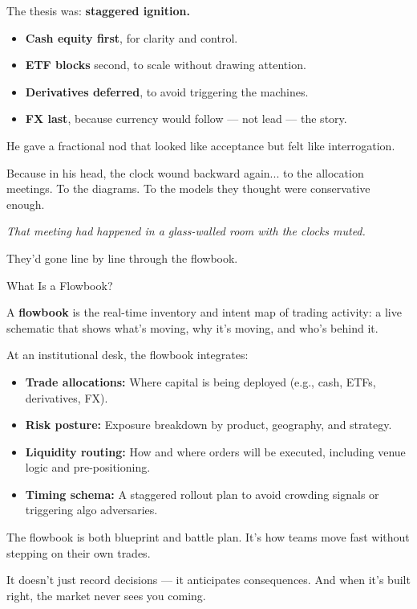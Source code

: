 The thesis was: \textbf{staggered ignition.}

\begin{itemize}
\item \textbf{Cash equity first}, for clarity and control.
\item \textbf{ETF blocks} second, to scale without drawing attention.
\item \textbf{Derivatives deferred}, to avoid triggering the machines.
\item \textbf{FX last}, because currency would follow — not lead — the story.
\end{itemize}

He gave a fractional nod that looked like acceptance but felt like interrogation.

Because in his head, the clock wound backward again... to the allocation meetings.
To the diagrams.
To the models they thought were conservative enough.

\textit{That meeting had happened in a glass-walled room with the clocks muted.}

They’d gone line by line through the flowbook.

\medskip

\begin{TechnicalSidebar}{What Is a Flowbook?}

    A \textbf{flowbook} is the real-time inventory and intent map of trading activity:  
    a live schematic that shows what’s moving, why it’s moving, and who’s behind it.
  
    \medskip
  
    At an institutional desk, the flowbook integrates:

    \medskip
  
    \begin{itemize}
      \item \textbf{Trade allocations:} Where capital is being deployed (e.g., cash, ETFs, 
      derivatives, FX).
      \item \textbf{Risk posture:} Exposure breakdown by product, geography, and strategy.
      \item \textbf{Liquidity routing:} How and where orders will be executed, including venue 
      logic and pre-positioning.
      \item \textbf{Timing schema:} A staggered rollout plan to avoid crowding signals or 
      triggering algo adversaries.
    \end{itemize}
  
    \medskip
  
    The flowbook is both blueprint and battle plan.  
    It’s how teams move fast without stepping on their own trades.
  
    \medskip
  
    It doesn’t just record decisions — it anticipates consequences.
    And when it’s built right, the market never sees you coming.
  
\end{TechnicalSidebar}

